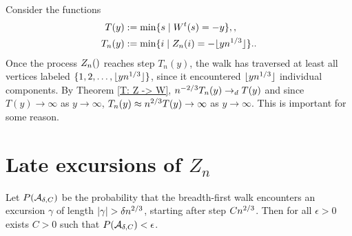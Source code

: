 Consider the functions
\begin{align}
T(y) &:= \min \{s \;|\; W^t(s)=-y\}, \label{E: def T(y)}, \\
T_n(y) &:= \min\{i \;|\; Z_n(i)=-\lfloor yn^{1 / 3}\rfloor \}. \label{E: def Tn(y)}.
\end{align}
Once the process $\Zn$ reaches step $T_n(y)$, 
the walk has traversed at least all vertices labeled $\{1,2,\dots,\lfloor yn^{1 / 3}\rfloor\}$,
since it encountered $\lfloor yn^{1 / 3}\rfloor$ individual components.
By Theorem \ref{T: Z -> W}, $n^{-2 / 3}T_n(y) \rightarrow_d T(y)$
and since $T(y) \rightarrow \infty$ as $y\rightarrow\infty$,
$T_n(y) \approx n^{2 / 3}T(y) \rightarrow\infty$ as $y\rightarrow \infty$.
This is important for some reason.


\section{Late excursions of $Z_n$}

\begin{lemma}
	Let 
	$P(\mathcal{A}_{\delta, C})$ 
	be the probability that the breadth-first walk encounters an excursion $\gamma$ of length 
	$|\gamma| > \delta n^{2 / 3}$, starting after step $Cn^{2 / 3}$.
	Then for all $\epsilon>0$ exists $C>0$ such that $P(\mathcal{A}_{\delta, C}) < \epsilon$. 
\end{lemma}

